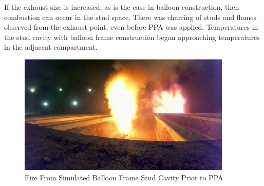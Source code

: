 \documentclass{article}
\begin{document}
If the exhaust size is increased, as is the case in balloon construction, then combustion can occur in the stud space. There was charring of studs and flames observed from the exhaust point, even before PPA was applied. Temperatures in the stud cavity with balloon frame construction began approaching temperatures in the adjacent compartment. 

\begin{figure}[H]
	\centering
	\includegraphics[width = 4in]{0_Images/Tactical_Considerations/Void_Space_Extension/FireBeforeFan.png}
	\caption{Fire From Simulated Balloon Frame Stud Cavity Prior to PPA}
	\label{fig:FireBeforeFan}
\end{figure}
\end{document}
